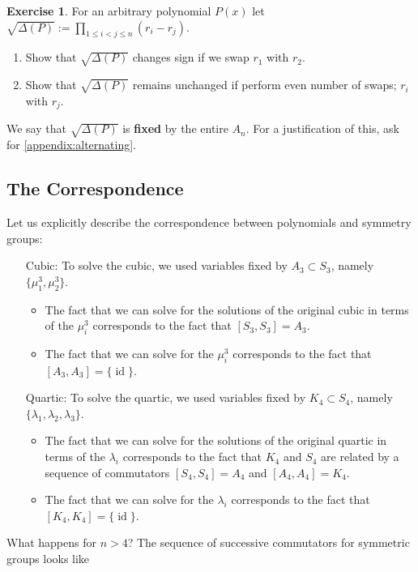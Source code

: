 \documentclass[reqno, 12pt, letter]{article}
\theoremstyle{plain}
\theoremstyle{definition}
\newtheorem{exercise}[theorem]{Exercise}
\theoremstyle{remark}
\numberwithin{equation}{section}
\DeclareMathOperator\id{id}
\begin{document}
\begin{exercise}For an arbitrary polynomial $ P(x)$ let $\sqrt{\Delta(P)} := \prod_{1 \leq i < j \leq n} (r_i - r_j)$.
	\begin{enumerate}
		\item Show that $ \sqrt{\Delta(P)}$ changes sign if we swap $ r_1$ with $ r_2$.
		\item Show that $ \sqrt{\Delta(P)}$ remains unchanged if perform even number of swaps; $ r_i$ with $ r_j$.
	\end{enumerate}
	We say that $ \sqrt{\Delta(P)}$ is \textbf{fixed} by the entire $ A_n$. For a justification of this, ask for \autoref{appendix:alternating}.
\end{exercise}


\subsection{The Correspondence}
Let us explicitly describe the correspondence between polynomials and symmetry groups:
\begin{enumerate}
	\item[Cubic:] To solve the cubic, we used variables fixed by $A_3 \subset S_3$, namely $\{\mu_1^3, \mu_2^3 \}$.
	      \begin{itemize}
					\item The fact that we can solve for the solutions of the original cubic in terms of the $\mu_i^3$ corresponds to the fact that $\left[ S_3, S_3 \right] = A_3$.
					\item The fact that we can solve for the $\mu_i^3$ corresponds to the fact that $\left[ A_3, A_3 \right] = \{ \id \}$.
	      \end{itemize}
	\item[Quartic:]
		To solve the quartic, we used variables fixed by $K_4 \subset S_4$, namely $\{\lambda_1, \lambda_2, \lambda_3 \}$.
	      \begin{itemize}
		      \item The fact that we can solve for the solutions of the original quartic in terms of the $\lambda_i$ corresponds to the fact that $K_4$ and $S_4$ are related by a sequence of commutators $\left[ S_4, S_4 \right] = A_4$ and $\left[ A_4, A_4 \right] = K_4$.
					\item The fact that we can solve for the $\lambda_i$ corresponds to the fact that $\left[ K_4, K_4 \right] = \{ \id \}$.
	      \end{itemize}
\end{enumerate}
What happens for $n>4$? The sequence of successive commutators for symmetric groups looks like
\end{document}
